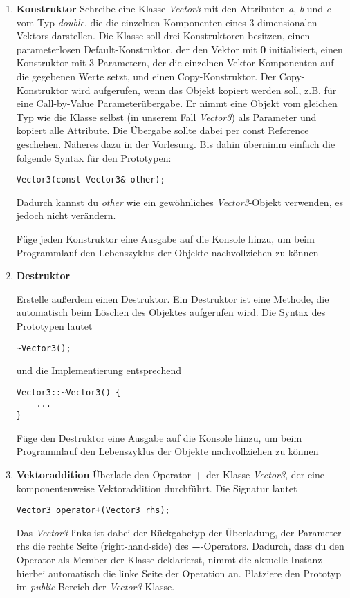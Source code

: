 \begin{enumerate}
\item \textbf{Konstruktor}
Schreibe eine Klasse \emph{Vector3} mit den Attributen \emph{a}, \emph{b} und \emph{c} vom Typ \emph{double}, die die einzelnen Komponenten eines 3-dimensionalen Vektors darstellen.
Die Klasse soll drei Konstruktoren besitzen, einen parameterlosen Default-Konstruktor, der den Vektor mit \textbf{0} initialisiert, einen Konstruktor mit 3 Parametern, der die einzelnen Vektor-Komponenten auf die gegebenen Werte setzt, und einen Copy-Konstruktor.
Der Copy-Konstruktor wird aufgerufen, wenn das Objekt kopiert werden soll, z.B. für eine Call-by-Value Parameterübergabe.
Er nimmt eine Objekt vom gleichen Typ wie die Klasse selbst (in unserem Fall \emph{Vector3}) als Parameter und kopiert alle Attribute.
Die Übergabe sollte dabei per const Reference geschehen.
Näheres dazu in der Vorlesung.
Bis dahin übernimm einfach die folgende Syntax für den Prototypen:
\begin{lstlisting}
Vector3(const Vector3& other);
\end{lstlisting} 

Dadurch kannst du \emph{other} wie ein gewöhnliches \emph{Vector3}-Objekt verwenden, es jedoch nicht verändern.

Füge jeden Konstruktor eine Ausgabe auf die Konsole hinzu, um beim Programmlauf den Lebenszyklus der Objekte nachvollziehen zu können

\item \textbf{Destruktor}

Erstelle außerdem einen Destruktor.
Ein Destruktor ist eine Methode, die automatisch beim Löschen des Objektes aufgerufen wird. Die Syntax des Prototypen lautet
\begin{lstlisting}
~Vector3();
\end{lstlisting} 

und die Implementierung entsprechend
\begin{lstlisting}
Vector3::~Vector3() {
	...
}
\end{lstlisting} 

Füge den Destruktor eine Ausgabe auf die Konsole hinzu, um beim Programmlauf den Lebenszyklus der Objekte nachvollziehen zu können

\item\textbf{Vektoraddition}
Überlade den Operator \textbf{+} der Klasse \emph{Vector3}, der eine komponentenweise Vektoraddition durchführt.
Die Signatur lautet
\begin{lstlisting}
Vector3 operator+(Vector3 rhs);
\end{lstlisting}
Das \emph{Vector3} links ist dabei der Rückgabetyp der Überladung, der Parameter rhs die rechte Seite (\glqq right-hand-side\grqq{}) des \textbf{+}-Operators.
Dadurch, dass du den Operator als Member der Klasse deklarierst, nimmt die aktuelle Instanz hierbei automatisch die linke Seite der Operation an.
Platziere den Prototyp im \emph{public}-Bereich der \emph{Vector3} Klasse.


\end{enumerate}
